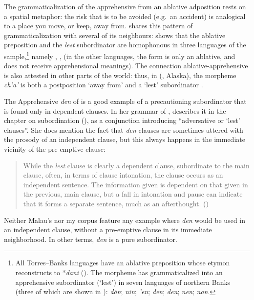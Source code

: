 \documentclass[output=paper,colorlinks,citecolor=brown]{langscibook}
\begin{document}
The grammaticalization of the apprehensive from an ablative adposition rests on a spatial metaphor: the risk that is to be avoided (e.g.\ an accident) is analogical to a place you move, or keep, away from.  shares this pattern of grammaticalization with several of its neighbours:  shows that the ablative preposition and the \textit{lest} subordinator are homophonous in three languages of the sample,\footnote{All Torres–Banks languages have an ablative preposition whose etymon reconstructs to *\textit{dani} (\citealt[494]{François2005b}). The morpheme has grammaticalized into an apprehensive subordinator (`lest') in seven languages of northern Banks (three of which are shown in ):  \textit{dän};  \textit{nin};  \textit{'en};  \textit{den};  \textit{den};  \textit{nen};  \textit{nan}.} namely , ,  (in the other languages, the form is only an ablative, and does not receive apprehensional meanings). The connection ablative-apprehensive is also attested in other parts of the world: thus, in  (, Alaska), the morpheme \textit{ch'a'} is both a postposition `away from' and a `lest' subordinator \citep{chapters/lovick}. 

The Apprehensive \textit{den} of  is a good example of a precautioning subordinator that is found only in dependent clauses. In her grammar of , \citeauthor{Malau2016} describes it in the chapter on subordination (\citeyear[677ff]{Malau2016}), as a conjunction introducing ``adversative or `lest' clauses''. She does mention the fact that \textit{den} clauses are sometimes uttered with the prosody of an independent clause, but this always happens in the immediate vicinity of the pre-emptive clause:

\begin{quote}
    While the \textit{lest} clause is clearly a dependent clause, subordinate to the main clause, often, in terms of clause intonation, the clause occurs as an independent sentence. The information given is dependent on that given in the previous, main clause, but a fall in intonation and pause can indicate that it forms a separate sentence, much as an afterthought. (\citealt[679]{Malau2016})
\end{quote}

Neither Malau's nor my corpus feature any example where   \textit{den} would be used in an independent clause, without a pre-emptive clause in its immediate neighborhood. In other terms, \textit{den} is a pure subordinator.
\end{document}
